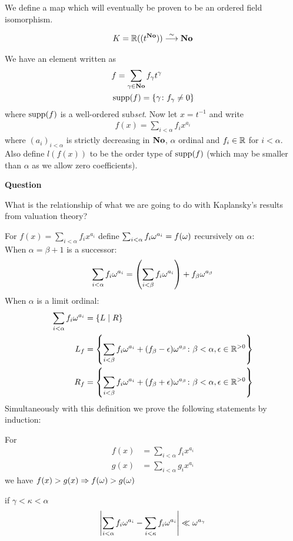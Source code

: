 
We define a map which will eventually be proven to be an ordered field isomorphism.

\begin{align*}
  K = \mathbb{R}((t^{\mathbf{No}})) \overset{\sim}{\longrightarrow} \mathbf{No}
\end{align*}

We have an element written as 
\begin{align*}
	&f = \sum_{\gamma \in \mathbf{No}} f_\gamma t^\gamma \\
	&\operatorname{supp}(f) = \{\gamma \colon f_\gamma \neq 0\}
\end{align*}
where $\operatorname{supp}(f)$ is a well-ordered sub\emph{set}. Now let $x = t^{-1}$ and write
\begin{align*}
  f(x) = \sum_{i < \alpha} f_i x^{a_i}
\end{align*}
where $(a_i)_{i<\alpha}$ is strictly decreasing in $\mathbf{No}$, $\alpha$ ordinal and $f_i \in \mathbb{R}$ for $i < \alpha$. Also define $l(f(x))$ to be the order type of $\operatorname{supp}(f)$ (which may be smaller than $\alpha$ as we allow zero coefficients).

\textbf{Question}

What is the relationship of what we are going to do with Kaplansky's results from valuation theory?

\begin{theorem} %
	For $f(x) = \sum_{i < \alpha} f_i x^{a_i}$ define $\sum_{i < \alpha} f_i \omega^{a_i} = f(\omega)$ recursively on $\alpha$: \\ 
	When $\alpha = \beta + 1$ is a successor:
	\begin{align*}
		\sum_{i < \alpha} f_i \omega^{a_i} = \left( \sum_{i < \beta} f_i \omega^{a_i} \right) + f_\beta \omega^{a_\beta}
	\end{align*}
	When $\alpha$ is a limit ordinal:
	\begin{align*}
		\sum_{i < \alpha} f_i \omega^{a_i} &= \left\{ L \mid R \right\} \\
		L_f &= \left\{ \sum_{i < \beta} f_i \omega^{a_i} + (f_\beta - \epsilon) \omega^{a_\beta}
		\colon \beta < \alpha, \epsilon \in \mathbb{R}^{>0} \right\} \\
		R_f &= \left\{ \sum_{i < \beta} f_i \omega^{a_i} + (f_\beta + \epsilon) \omega^{a_\beta}
		\colon \beta < \alpha, \epsilon \in \mathbb{R}^{>0} \right\}
	\end{align*}
	Simultaneously with this definition we prove the following statements by induction:

	For \begin{align*}
		f(x) &= \sum_{i < \alpha} f_i x^{a_i} \\
		g(x) &= \sum_{i < \alpha} g_i x^{a_i}
	\end{align*} we have $f(x) > g(x) \Rightarrow f(\omega) > g(\omega)$

	 if $\gamma < \kappa < \alpha$
	\begin{align*}
		\left| \sum_{i < \alpha} f_i \omega^{a_i} - \sum_{i < \kappa} f_i \omega^{a_i} \right| \ll \omega^{a_\gamma}
	\end{align*}
\end{theorem}

